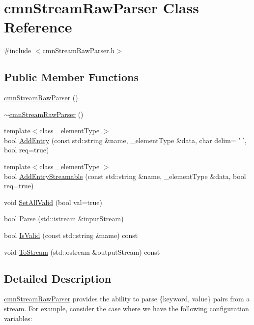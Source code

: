 \hypertarget{classcmn_stream_raw_parser}{\section{cmn\-Stream\-Raw\-Parser Class Reference}
\label{classcmn_stream_raw_parser}
}


{\ttfamily \#include $<$cmn\-Stream\-Raw\-Parser.\-h$>$}

\subsection*{Public Member Functions}
\begin{DoxyCompactItemize}
\item 
\hyperlink{classcmn_stream_raw_parser_a17a4741c2c4b13d84549b7f182fc4858}{cmn\-Stream\-Raw\-Parser} ()
\item 
\hyperlink{classcmn_stream_raw_parser_afe4a08697751aa20fe0a7a91ce8cb917}{$\sim$cmn\-Stream\-Raw\-Parser} ()
\item 
{\footnotesize template$<$class \-\_\-element\-Type $>$ }\\bool \hyperlink{classcmn_stream_raw_parser_a85682f38234f9f9c9c452240511f52ba}{Add\-Entry} (const std\-::string \&name, \-\_\-element\-Type \&data, char delim= ' ', bool req=true)
\item 
{\footnotesize template$<$class \-\_\-element\-Type $>$ }\\bool \hyperlink{classcmn_stream_raw_parser_a6fd698505c5456edf6659d2eb3c7525c}{Add\-Entry\-Streamable} (const std\-::string \&name, \-\_\-element\-Type \&data, bool req=true)
\item 
void \hyperlink{classcmn_stream_raw_parser_a88730a1b1051f68bf00fade19bef41cf}{Set\-All\-Valid} (bool val=true)
\item 
bool \hyperlink{classcmn_stream_raw_parser_aa414a151c05b00e73c20d1ed13c94d7a}{Parse} (std\-::istream \&input\-Stream)
\item 
bool \hyperlink{classcmn_stream_raw_parser_a5fb2061460327342e5a9b772272bccec}{Is\-Valid} (const std\-::string \&name) const 
\item 
void \hyperlink{classcmn_stream_raw_parser_a34cc22ae5fb87be3563dbce530bc6e1d}{To\-Stream} (std\-::ostream \&output\-Stream) const 
\end{DoxyCompactItemize}


\subsection{Detailed Description}
\hyperlink{classcmn_stream_raw_parser}{cmn\-Stream\-Raw\-Parser} provides the ability to parse \{keyword, value\} pairs from a stream. For example, consider the case where we have the following configuration variables\-:


